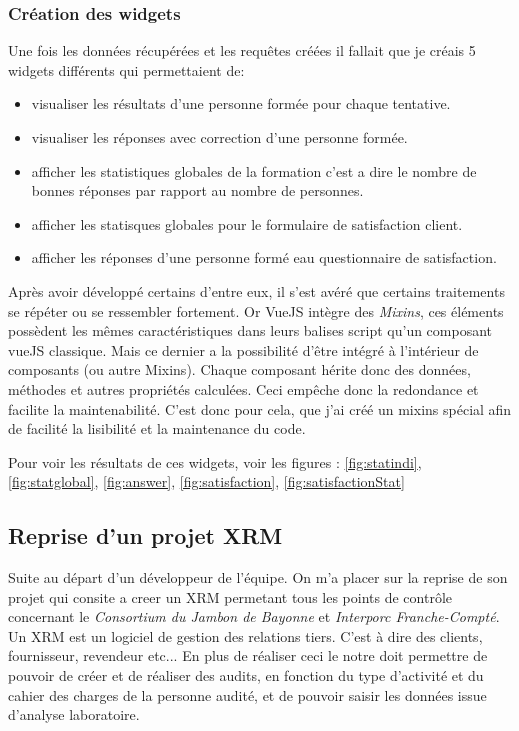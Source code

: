 \subsubsection{Création des widgets}

Une fois les données récupérées et les requêtes créées il fallait que je créais 5 widgets différents qui permettaient de: 
\begin{itemize}
    \item visualiser les résultats d'une personne formée pour chaque tentative. 
    \item  visualiser les réponses avec correction d'une personne formée.
    \item afficher les statistiques globales de la formation c'est a dire le nombre de bonnes réponses par rapport au nombre de personnes.
    \item afficher les statisques globales pour le formulaire de satisfaction client. 
    \item afficher les réponses d'une personne formé eau questionnaire de satisfaction.  
\end{itemize}

Après avoir développé certains d'entre eux, il s'est avéré que certains traitements se répéter ou se ressembler fortement. Or VueJS intègre des \textit{Mixins}, ces éléments possèdent les mêmes caractéristiques dans leurs balises script qu'un composant vueJS classique. Mais ce dernier a la possibilité d'être intégré à l'intérieur de composants (ou autre Mixins). Chaque composant hérite donc des données, méthodes et autres propriétés calculées. Ceci empêche donc la redondance et facilite la maintenabilité.
C'est donc pour cela, que j'ai créé un mixins spécial afin de facilité la lisibilité et la maintenance du code. 

Pour voir les résultats de ces widgets, voir les figures : \ref{fig:statindi}, \ref{fig:statglobal}, \ref{fig:answer}, \ref{fig:satisfaction}, \ref{fig:satisfactionStat}


\subsection{Reprise d'un projet XRM}
Suite au départ d'un développeur de l'équipe. On m'a placer sur la reprise de son projet qui consite a creer un XRM permetant tous les points de contrôle concernant le \textit{Consortium du Jambon de Bayonne} et \textit{Interporc Franche-Compté}.
Un XRM est un logiciel de gestion des relations tiers. C'est à dire des clients, fournisseur, revendeur etc... En plus de réaliser ceci le notre doit permettre de pouvoir de créer et de réaliser des audits, en fonction du type d'activité et du cahier des charges de la personne audité, et de pouvoir saisir les données issue d'analyse laboratoire.

